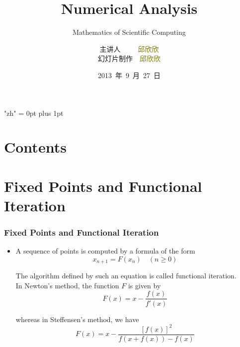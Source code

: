 \documentclass[notheorems,mathserif,table,compress]{beamer}  %
\begin{document}
\XeTeXlinebreaklocale "zh"         %
\XeTeXlinebreakskip = 0pt plus 1pt %


\title[Numerical Analysis]{Numerical Analysis}
\subtitle{Mathematics of Scientific Computing}
\author[qiu]{主讲人~~~~~\textcolor{olive}{邱欣欣}\\
    \quad 幻灯片制作~~\textcolor{olive}{邱欣欣}}
\institute[中国海洋大学]{\small\textcolor{violet}{中国海洋大学~~信息科学与工程学院}}
\date{2013~年~9~月~27~日}
\frame{ \titlepage }
\section*{Contents}
\section{Fixed Points and Functional Iteration}

\begin{frame}
\frametitle{Fixed Points and Functional Iteration}
\begin{itemize}
\item A sequence of points is computed by a formula of the form
\begin{equation}
x_{n+1}=F(x_{n}) \quad(n\geq0) 
\end{equation}

The algorithm defined by such an equation is called \textsf{functional iteration}.\\
In Newton's method, the function $F$ is given by
\begin{displaymath}
F(x)=x-\frac{f(x)}{f'(x)}
\end{displaymath}

whereas in Steffensen's method, we have
\begin{displaymath}
F(x)=x-\frac{[f(x)]^2}{f(x+f(x))-f(x)}
\end{displaymath}

\end{itemize}
\end{frame}
\end{document}
